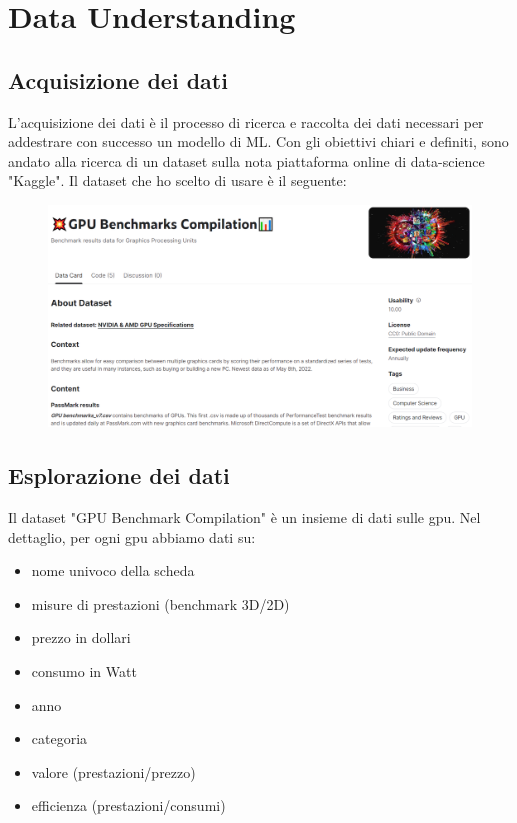 \documentclass{article}
\begin{document}
\newpage
\section{Data Understanding}
    \subsection{Acquisizione dei dati}
    L'acquisizione dei dati è il processo di ricerca e raccolta dei dati necessari per addestrare con successo un modello di ML. 
    Con gli obiettivi chiari e definiti, sono andato alla ricerca di un dataset sulla nota piattaforma online di data-science "Kaggle".
    Il dataset che ho scelto di usare è il seguente:
    \begin{figure}[H]
    \centering
    \includegraphics[width=0.95\linewidth]{kaggle_dataset.png}
    \end{figure}
    
    
    \subsection{Esplorazione dei dati}
    Il dataset "GPU Benchmark Compilation" è un insieme di dati sulle gpu.
    Nel dettaglio, per ogni gpu abbiamo dati su:
     \begin{itemize}
        \item nome univoco della scheda 
        \item misure di prestazioni (benchmark 3D/2D)
        \item prezzo in dollari
        \item consumo in Watt 
        \item anno
        \item categoria
        \item valore (prestazioni/prezzo)
        \item efficienza (prestazioni/consumi)
        \end{itemize}
\end{document}
